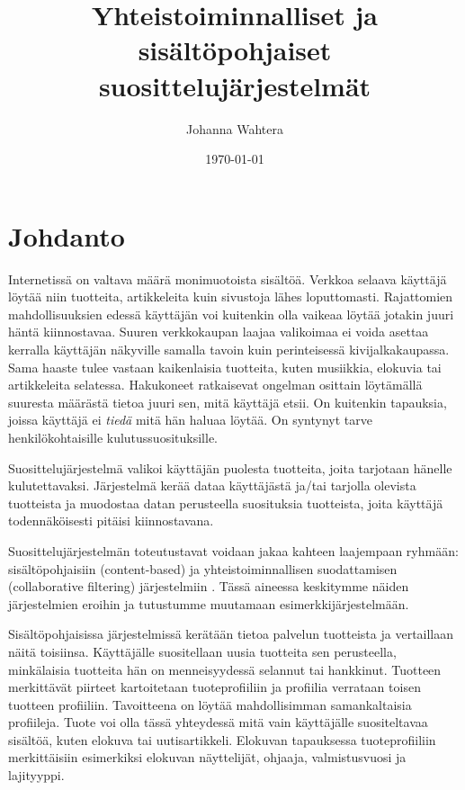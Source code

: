 \documentclass[12pt,finnish]{tktltiki2}
\title{Yhteistoiminnalliset ja sisältöpohjaiset suosittelujärjestelmät}
\author{Johanna Wahtera}
\date{\today}
\theoremstyle{definition}
\theoremstyle{remark}
\begin{document}

\frontmatter      %

\maketitle        %
\makeabstract     %

\tableofcontents  %


\mainmatter       %


\section{Johdanto}
         Internetissä on valtava määrä monimuotoista sisältöä. Verkkoa selaava käyttäjä löytää niin tuotteita, artikkeleita kuin sivustoja lähes loputtomasti. Rajattomien mahdollisuuksien edessä käyttäjän voi kuitenkin olla vaikeaa löytää jotakin juuri häntä kiinnostavaa. Suuren verkkokaupan laajaa valikoimaa ei voida asettaa kerralla käyttäjän näkyville samalla tavoin kuin perinteisessä kivijalkakaupassa. Sama haaste tulee vastaan kaikenlaisia tuotteita, kuten musiikkia, elokuvia tai artikkeleita selatessa. Hakukoneet ratkaisevat ongelman osittain löytämällä suuresta määrästä tietoa juuri sen, mitä käyttäjä etsii. On kuitenkin tapauksia, joissa käyttäjä ei \textit{tiedä} mitä hän haluaa löytää. On syntynyt tarve henkilökohtaisille kulutussuosituksille.
        
Suosittelujärjestelmä valikoi käyttäjän puolesta tuotteita, joita tarjotaan hänelle kulutettavaksi. Järjestelmä kerää dataa käyttäjästä ja/tai tarjolla olevista tuotteista ja muodostaa datan perusteella suosituksia tuotteista, joita käyttäjä todennäköisesti pitäisi kiinnostavana.

Suosittelujärjestelmän toteutustavat voidaan jakaa kahteen laajempaan ryhmään: sisältöpohjaisiin (content-based) ja yhteistoiminnallisen suodattamisen (collaborative filtering) järjestelmiin \cite{Balabanovic:1997:FCC:245108.245124}.
Tässä aineessa keskitymme näiden järjestelmien eroihin ja tutustumme muutamaan esimerkkijärjestelmään.

        Sisältöpohjaisissa järjestelmissä kerätään tietoa palvelun tuotteista ja vertaillaan näitä toisiinsa. Käyttäjälle suositellaan uusia tuotteita sen perusteella, minkälaisia tuotteita hän on menneisyydessä selannut tai hankkinut. Tuotteen merkittävät piirteet kartoitetaan tuoteprofiiliin ja profiilia verrataan toisen tuotteen profiiliin. Tavoitteena on löytää mahdollisimman samankaltaisia profiileja. Tuote voi olla tässä yhteydessä mitä vain käyttäjälle suositeltavaa sisältöä, kuten elokuva tai uutisartikkeli. Elokuvan tapauksessa tuoteprofiiliin merkittäisiin esimerkiksi elokuvan näyttelijät, ohjaaja, valmistusvuosi ja lajityyppi. 
        
\end{document}

